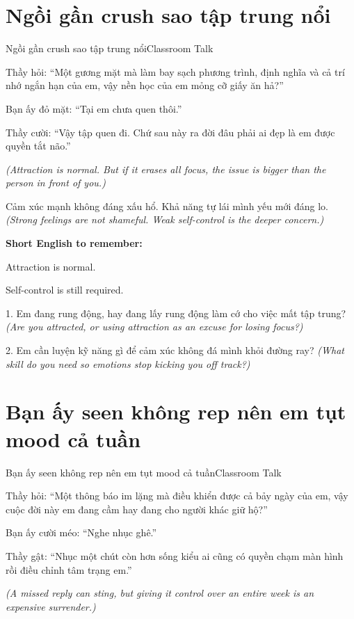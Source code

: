 \section{Ngồi gần crush sao tập trung nổi}
\begin{truyen}{Ngồi gần crush sao tập trung nổi}{Classroom Talk}

Thầy hỏi: ``Một gương mặt mà làm bay sạch phương trình, định nghĩa và cả trí nhớ ngắn hạn của em, vậy nền học của em mỏng cỡ giấy ăn hả?''

Bạn ấy đỏ mặt: ``Tại em chưa quen thôi.''

Thầy cười: ``Vậy tập quen đi. Chứ sau này ra đời đâu phải ai đẹp là em được quyền tắt não.''

\textit{(Attraction is normal. But if it erases all focus, the issue is bigger than the person in front of you.)}
\end{truyen}

\begin{baihoc}
Cảm xúc mạnh không đáng xấu hổ. Khả năng tự lái mình yếu mới đáng lo.
\textit{(Strong feelings are not shameful. Weak self-control is the deeper concern.)}
\end{baihoc}

\begin{ghinhoanh}
\textbf{Short English to remember:}

Attraction is normal.

Self-control is still required.
\end{ghinhoanh}

\begin{tuhocnhanh}
1. Em đang rung động, hay đang lấy rung động làm cớ cho việc mất tập trung? \textit{(Are you attracted, or using attraction as an excuse for losing focus?)}

2. Em cần luyện kỹ năng gì để cảm xúc không đá mình khỏi đường ray? \textit{(What skill do you need so emotions stop kicking you off track?)}
\end{tuhocnhanh}
\ngancach

\section{Bạn ấy seen không rep nên em tụt mood cả tuần}
\begin{truyen}{Bạn ấy seen không rep nên em tụt mood cả tuần}{Classroom Talk}

Thầy hỏi: ``Một thông báo im lặng mà điều khiển được cả bảy ngày của em, vậy cuộc đời này em đang cầm hay đang cho người khác giữ hộ?''

Bạn ấy cười méo: ``Nghe nhục ghê.''

Thầy gật: ``Nhục một chút còn hơn sống kiểu ai cũng có quyền chạm màn hình rồi điều chỉnh tâm trạng em.''

\textit{(A missed reply can sting, but giving it control over an entire week is an expensive surrender.)}
\end{truyen}

